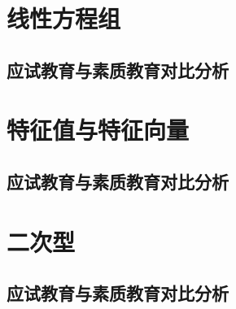 \documentclass[UTF8]{ctexart}
\begin{document}
	\par{}
\section{线性方程组}
	\subsection{}
	
	\subsection{应试教育与素质教育对比分析}

	\par{}
\section{特征值与特征向量}
	\subsection{}
	
	\subsection{应试教育与素质教育对比分析}

	\par{}

\section{二次型}
	\subsection{}
	
	\subsection{应试教育与素质教育对比分析}

	\par{}

	
\end{document}
